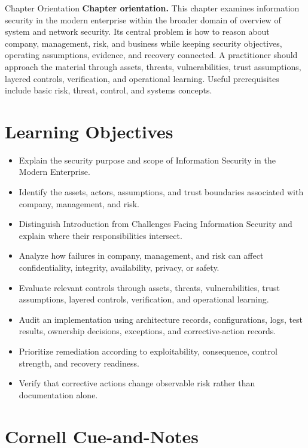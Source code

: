 \documentclass[11pt,letterpaper]{article}
\title{\CornellDocumentTitle}
\author{}
\date{}
\begin{document}
\maketitle
\begin{CornellOverviewBox}{Chapter Orientation}
\textbf{Chapter orientation.} This chapter examines information security in the modern enterprise within the broader domain of overview of system and network security. Its central problem is how to reason about company, management, risk, and business while keeping security objectives, operating assumptions, evidence, and recovery connected. A practitioner should approach the material through assets, threats, vulnerabilities, trust assumptions, layered controls, verification, and operational learning. Useful prerequisites include basic risk, threat, control, and systems concepts.
\end{CornellOverviewBox}
\section*{Learning Objectives}
\begin{itemize}
\item Explain the security purpose and scope of Information Security in the Modern Enterprise.
\item Identify the assets, actors, assumptions, and trust boundaries associated with company, management, and risk.
\item Distinguish Introduction from Challenges Facing Information Security and explain where their responsibilities intersect.
\item Analyze how failures in company, management, and risk can affect confidentiality, integrity, availability, privacy, or safety.
\item Evaluate relevant controls through assets, threats, vulnerabilities, trust assumptions, layered controls, verification, and operational learning.
\item Audit an implementation using architecture records, configurations, logs, test results, ownership decisions, exceptions, and corrective-action records.
\item Prioritize remediation according to exploitability, consequence, control strength, and recovery readiness.
\item Verify that corrective actions change observable risk rather than documentation alone.
\end{itemize}
\section*{Cornell Cue-and-Notes}
\end{document}
